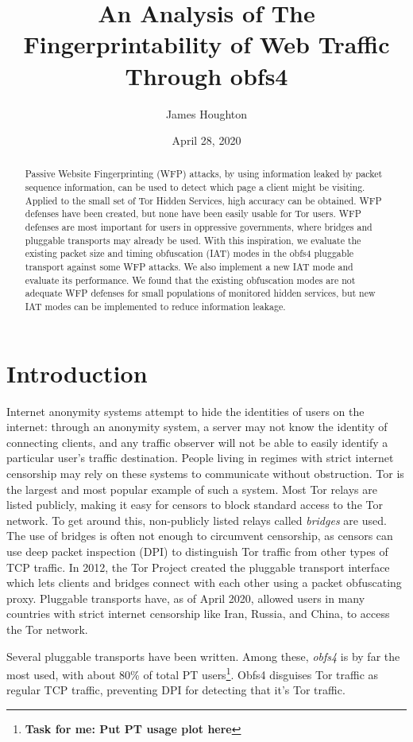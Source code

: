 \documentclass[11pt]{article}
\title{An Analysis of The Fingerprintability of Web Traffic Through obfs4}
\author{James Houghton}
\affil[]{\textit{jth5zs@virginia.edu}}
\date{April 28, 2020}
\begin{document}
\maketitle

\begin{abstract}
Passive Website Fingerprinting (WFP) attacks, by using information leaked by packet sequence information, can be used to detect which page a client might be visiting. Applied to the small set of Tor Hidden Services, high accuracy can be obtained. WFP defenses have been created, but none have been easily usable for Tor users. WFP defenses are most important for users in oppressive governments, where bridges and pluggable transports may already be used. With this inspiration, we evaluate the existing packet size and timing obfuscation (IAT) modes in the obfs4 pluggable transport against some WFP attacks. We also implement a new IAT mode and evaluate its performance. We found that the existing obfuscation modes are not adequate WFP defenses for small populations of monitored hidden services, but new IAT modes can be implemented to reduce information leakage.
\end{abstract}

\section{Introduction}
Internet anonymity systems attempt to hide the identities of users on the internet: through an anonymity system, a server may not know the identity of connecting clients, and any traffic observer will not be able to easily identify a particular user's traffic destination. People living in regimes with strict internet censorship may rely on these systems to communicate without obstruction. Tor is the largest and most popular example of such a system. Most Tor relays are listed publicly, making it easy for censors to block standard access to the Tor network. To get around this, non-publicly listed relays called \textit{bridges} are used. The use of bridges is often not enough to circumvent censorship, as censors can use deep packet inspection (DPI) to distinguish Tor traffic from other types of TCP traffic. In 2012, the Tor Project created the pluggable transport interface which lets clients and bridges connect with each other using a packet obfuscating proxy. Pluggable transports have, as of April 2020, allowed users in many countries with strict internet censorship like Iran, Russia, and China, to access the Tor network.

Several pluggable transports have been written. Among these, \textit{obfs4} is by far the most used, with about 80\% of total PT users\footnote{\textbf{Task for me: Put PT usage plot here}}.
Obfs4 disguises Tor traffic as regular TCP traffic, preventing DPI for detecting that it's Tor traffic.
\end{document}
